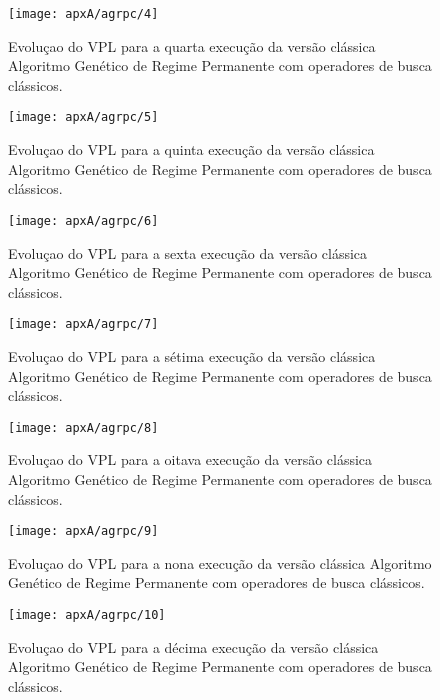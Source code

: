 \begin{figure}[H]
\centering
\texttt{[image: apxA/agrpc/4]}
\caption{Evoluçao do VPL para a quarta execução da versão clássica Algoritmo Genético de Regime Permanente com operadores de busca clássicos.}
\label{fig:graphGRP1-04}
\end{figure}

\begin{figure}[H]
\centering
\texttt{[image: apxA/agrpc/5]}
\caption{Evoluçao do VPL para a quinta execução da versão clássica Algoritmo Genético de Regime Permanente com operadores de busca clássicos.}
\label{fig:graphGRP1-05}
\end{figure}

\begin{figure}[H]
\centering
\texttt{[image: apxA/agrpc/6]}
\caption{Evoluçao do VPL para a sexta execução da versão clássica Algoritmo Genético de Regime Permanente com operadores de busca clássicos.}
\label{fig:graphGRP1-06}
\end{figure}

\begin{figure}[H]
\centering
\texttt{[image: apxA/agrpc/7]}
\caption{Evoluçao do VPL para a sétima execução da versão clássica Algoritmo Genético de Regime Permanente com operadores de busca clássicos.}
\label{fig:graphGRP1-07}
\end{figure}

\begin{figure}[H]
\centering
\texttt{[image: apxA/agrpc/8]}
\caption{Evoluçao do VPL para a oitava execução da versão clássica Algoritmo Genético de Regime Permanente com operadores de busca clássicos.}
\label{fig:graphGRP1-08}
\end{figure}

\begin{figure}[H]
\centering
\texttt{[image: apxA/agrpc/9]}
\caption{Evoluçao do VPL para a nona execução da versão clássica Algoritmo Genético de Regime Permanente com operadores de busca clássicos.}
\label{fig:graphGRP1-09}
\end{figure}

\begin{figure}[H]
\centering
\texttt{[image: apxA/agrpc/10]}
\caption{Evoluçao do VPL para a décima execução da versão clássica Algoritmo Genético de Regime Permanente com operadores de busca clássicos.}
\label{fig:graphGRP1-10}
\end{figure}